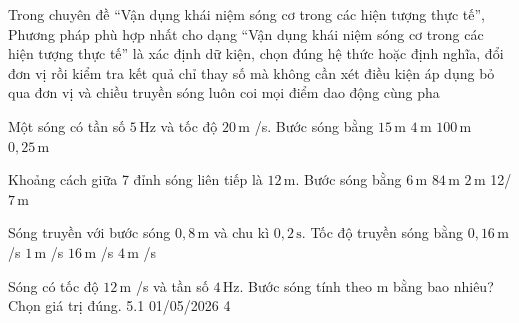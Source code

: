 \begin{ex}
Trong chuyên đề “Vận dụng khái niệm sóng cơ trong các hiện tượng thực tế”, Phương pháp phù hợp nhất cho dạng “Vận dụng khái niệm sóng cơ trong các hiện tượng thực tế” là
\choice
{\True xác định dữ kiện, chọn đúng hệ thức hoặc định nghĩa, đổi đơn vị rồi kiểm tra kết quả}
{chỉ thay số mà không cần xét điều kiện áp dụng}
{bỏ qua đơn vị và chiều truyền sóng}
{luôn coi mọi điểm dao động cùng pha}
\end{ex}

\begin{ex}
Một sóng có tần số $5\,\text{Hz}$ và tốc độ $20\,\text{m}$ /s. Bước sóng bằng
\choice
{$15\,\text{m}$}
{\True $4\,\text{m}$}
{$100\,\text{m}$}
{$0,25\,\text{m}$}
\end{ex}

\begin{ex}
Khoảng cách giữa 7 đỉnh sóng liên tiếp là $12\,\text{m}$. Bước sóng bằng
\choice
{$6\,\text{m}$}
{$84\,\text{m}$}
{\True $2\,\text{m}$}
{12/ $7\,\text{m}$}
\end{ex}

\begin{ex}
Sóng truyền với bước sóng $0,8\,\text{m}$ và chu kì $0,2\,\text{s}$. Tốc độ truyền sóng bằng
\choice
{$0,16\,\text{m}$ /s}
{$1\,\text{m}$ /s}
{$16\,\text{m}$ /s}
{\True $4\,\text{m}$ /s}
\end{ex}

\begin{ex}
Sóng có tốc độ $12\,\text{m}$ /s và tần số $4\,\text{Hz}$. Bước sóng tính theo m bằng bao nhiêu? Chọn giá trị đúng.
\choice
{}
{5.1}
{01/05/2026}
{4}
\end{ex}

